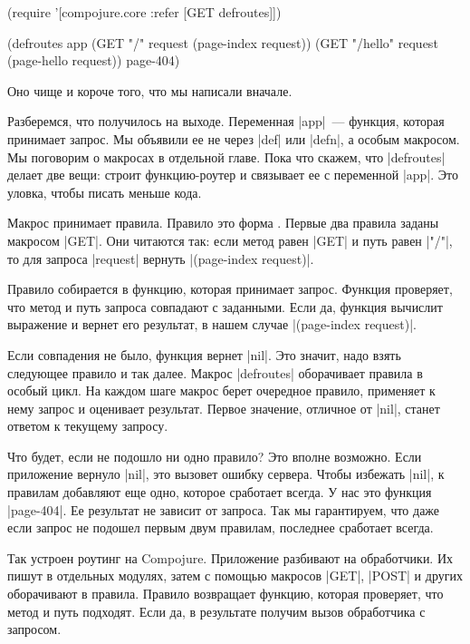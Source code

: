 \begin{english}
  \begin{clojure}
(require '[compojure.core :refer [GET defroutes]])

(defroutes app
  (GET "/"      request (page-index request))
  (GET "/hello" request (page-hello request))
  page-404)
  \end{clojure}
\end{english}

\noindent
Оно чище и короче того, что мы написали вначале.

Разберемся, что получилось на выходе. Переменная \spverb|app|~--- функция,
которая принимает запрос. Мы объявили ее не через \spverb|def| или
\spverb|defn|, а особым макросом. Мы поговорим о макросах в отдельной
главе. Пока что скажем, что \spverb|defroutes| делает две вещи: строит
функцию-роутер и связывает ее с переменной \spverb|app|. Это уловка, чтобы
писать меньше кода.

Макрос принимает правила. Правило это форма .
Первые два правила заданы макросом \spverb|GET|. Они читаются так:
если метод равен \spverb|GET| и путь равен \spverb|"/"|, то для запроса
\spverb|request| вернуть \spverb|(page-index request)|.

Правило собирается в функцию, которая принимает запрос. Функция проверяет, что
метод и путь запроса совпадают с заданными. Если да, функция вычислит выражение
и вернет его результат, в нашем случае \spverb|(page-index request)|.

Если совпадения не было, функция вернет \spverb|nil|. Это значит, надо взять
следующее правило и так далее. Макрос \spverb|defroutes| оборачивает правила в
особый цикл. На каждом шаге макрос берет очередное правило, применяет к нему
запрос и оценивает результат. Первое значение, отличное от \spverb|nil|, станет
ответом к текущему запросу.

Что будет, если не подошло ни одно правило? Это вполне возможно. Если приложение
вернуло \spverb|nil|, это вызовет ошибку сервера. Чтобы избежать \spverb|nil|, к
правилам добавляют еще одно, которое сработает всегда. У нас это функция
\spverb|page-404|. Ее результат не зависит от запроса. Так мы гарантируем, что
даже если запрос не подошел первым двум правилам, последнее сработает всегда.

Так устроен роутинг на Compojure. Приложение разбивают на обработчики.  Их пишут
в отдельных модулях, затем с помощью макросов \spverb|GET|, \spverb|POST| и
других оборачивают в правила. Правило возвращает функцию, которая проверяет, что
метод и путь подходят. Если да, в результате получим вызов обработчика с
запросом.

